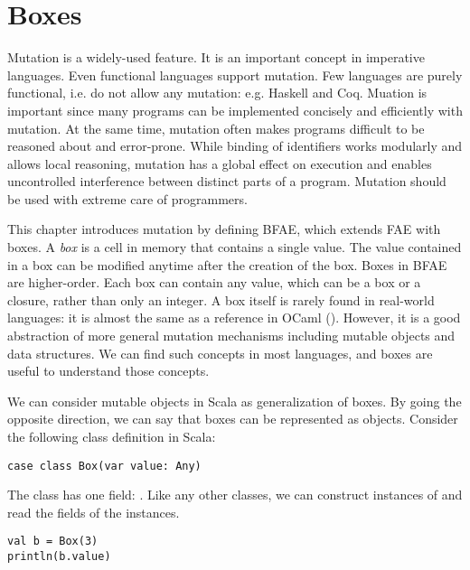 \setchapterpreamble[u]{\margintoc}
\chapter{Boxes}

\renewcommand{\plang}{\textsf{FAE}\xspace}
\renewcommand{\lang}{\textsf{BFAE}\xspace}

Mutation is a widely-used feature. It is an important concept in imperative
languages. Even functional languages support mutation. Few languages are purely
functional, i.e. do not allow any mutation: e.g. Haskell and Coq. Muation is
important since many programs can be implemented concisely and efficiently with
mutation. At the same time, mutation often makes programs difficult to be
reasoned about and error-prone. While binding of identifiers works modularly and
allows local reasoning, mutation has a global effect on execution and enables
uncontrolled interference between distinct parts of a program. Mutation should
be used with extreme care of programmers.

This chapter introduces mutation by defining \lang, which extends \plang with
boxes. A \textit{box} is a cell in memory that contains a single value. The value
contained in a box can be modified anytime after the creation of the box.
Boxes in \lang are higher-order. Each box can contain any value, which can be
a box or a closure, rather than only an integer.
A box itself is rarely found in real-world languages: it is almost the same as
a reference in OCaml (). However, it is a good abstraction of more
general mutation mechanisms including mutable objects and data
structures. We can find such concepts in most languages, and boxes are useful to
understand those concepts.

We can consider mutable objects in Scala as generalization of boxes. By
going the opposite direction, we can say that boxes can be represented as
objects. Consider the following class definition in Scala:

\begin{verbatim}
case class Box(var value: Any)
\end{verbatim}

The class  has one field: . Like any other classes, we can
construct instances of  and read the fields of the instances.

\begin{verbatim}
val b = Box(3)
println(b.value)
\end{verbatim}

